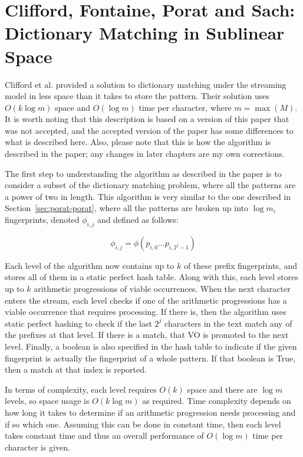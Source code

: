 \documentclass[ %
                    author={Dominic Joseph Moylett},
                    degree={MEng},
                     title={Dictionary Matching with Fingerprints},
                  subtitle={An Empirical Analysis},
                      type={research},
                      year={2015} ]{dissertation}
\begin{document}
\section{Clifford, Fontaine, Porat and Sach: Dictionary Matching in Sublinear Space}
\label{sec:theory-clifford}

Clifford et al. \cite{2015arXiv150406242C} provided a solution to dictionary matching under the streaming model in less space than it takes to store the pattern. Their solution uses $O(k\log m)$ space and $O(\log m)$ time per character, where $m = \max(M)$. It is worth noting that this description is based on a version of this paper that was not accepted, and the accepted version of the paper has some differences to what is described here. Also, please note that this is how the algorithm is described in the paper; any changes in later chapters are my own corrections.

The first step to understanding the algorithm as described in the paper is to consider a subset of the dictionary matching problem, where all the patterns are a power of two in length. This algorithm is very similar to the one described in Section~\ref{sec:porat-porat}, where all the patterns are broken up into $\log m_i$ fingerprints, denoted $\phi_{i,j}$ and defined as follows:

$$\phi_{i,j} = \phi(p_{i,0}...p_{i,2^j-1})$$

Each level of the algorithm now contains up to $k$ of these prefix fingerprints, and stores all of them in a static perfect hash table. Along with this, each level stores up to $k$ arithmetic progressions of viable occurrences. When the next character enters the stream, each level checks if one of the arithmetic progressions has a viable occurrence that requires processing. If there is, then the algorithm uses static perfect hashing to check if the last $2^j$ characters in the text match any of the prefixes at that level. If there is a match, that VO is promoted to the next level. Finally, a boolean is also specified in the hash table to indicate if the given fingerprint is actually the fingerprint of a whole pattern. If that boolean is True, then a match at that index is reported.

In terms of complexity, each level requires $O(k)$ space and there are $\log m$ levels, so space usage is $O(k\log m)$ as required. Time complexity depends on how long it takes to determine if an arithmetic progression needs processing and if so which one. Assuming this can be done in constant time, then each level takes constant time and thus an overall performance of $O(\log m)$ time per character is given.
\end{document}
